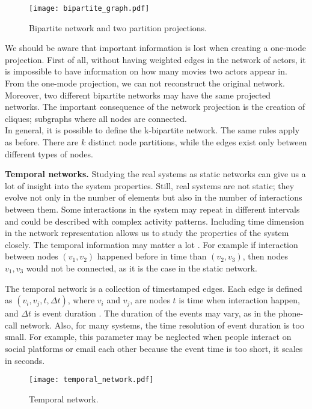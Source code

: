 \begin{figure}[h]
	\centering
	\texttt{[image: bipartite\_graph.pdf]} 
	\caption[Bipartite network.]{Bipartite network and two partition projections.}
	\label{fig:gt2}
\end{figure}

We should be aware that important information is lost when creating a one-mode projection. First of all, without having weighted edges in the network of actors, it is impossible to have information on how many movies two actors appear in. From the one-mode projection, we can not reconstruct the original network. Moreover, two different bipartite networks may have the same projected networks. The important consequence of the network projection is the creation of cliques; subgraphs where all nodes are connected. \\
In general, it is possible to define the k-bipartite network. The same rules apply as before. There are $k$ distinct node partitions, while the edges exist only between different types of nodes.

\textbf{Temporal networks.}
Studying the real systems as static networks can give us a lot of insight into the system properties. Still, real systems are not static; they evolve not only in the number of elements but also in the number of interactions between them. Some interactions in the system may repeat in different intervals and could be described with complex activity patterns. Including time dimension in the network representation allows us to study the properties of the system closely. The temporal information may matter a lot \cite{holme2012}. For example if interaction between nodes $(v_1, v_2)$ happened before in time than  $(v_2, v_3)$, then nodes $v_1, v_3$ would not be connected, as it is the case in the static network. 

The temporal network is a collection of timestamped edges. Each edge is defined as $(v_i, v_j, t, \Delta t)$, where $v_i$ and $v_j$, are nodes $t$ is time when interaction happen, and $\Delta t$ is event duration \cite{guide_temporal}. The duration of the events may vary, as in the phone-call network. Also, for many systems, the time resolution of event duration is too small. For example, this parameter may be neglected when people interact on social platforms or email each other because the event time is too short, it scales in seconds.

\begin{figure}[h]
	\centering
	\texttt{[image: temporal\_network.pdf]} 
	\caption[Temporal network.]{Temporal network. }
	\label{fig:gt3}
\end{figure}

